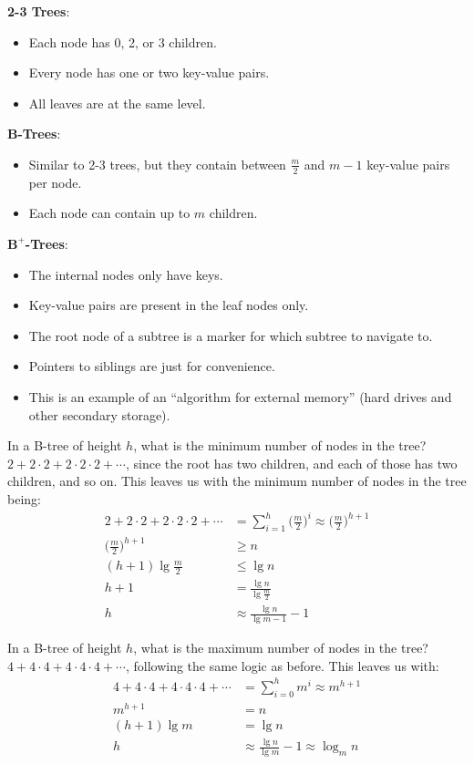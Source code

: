 \documentclass[]{article}
\theoremstyle{definition}
\begin{document}
			\textbf{2-3 Trees}:
			\begin{itemize}
				\item Each node has 0, 2, or 3 children.
				\item Every node has one or two key-value pairs.
				\item All leaves are at the same level.
			\end{itemize}

			\textbf{B-Trees}:
			\begin{itemize}
				\item Similar to 2-3 trees, but they contain between $\frac{m}{2}$ and $m - 1$ key-value pairs per node.
				\item Each node can contain up to $m$ children.
			\end{itemize}

			\textbf{$\boldsymbol{B^+}$-Trees}:
			\begin{itemize}
				\item The internal nodes only have keys.
				\item Key-value pairs are present in the leaf nodes only.
				\item The root node of a subtree is a marker for which subtree to navigate to.
				\item Pointers to siblings are just for convenience.
				\item This is an example of an ``algorithm for external memory'' (hard drives and other secondary storage). 
			\end{itemize}

			In a B-tree of height $h$, what is the minimum number of nodes in the tree? $2 + 2 \cdot 2 + 2 \cdot 2 \cdot 2 + \cdots$, since the root has two children, and each of those has two children, and so on. This leaves us with the minimum number of nodes in the tree being:
			\begin{align*}
				2 + 2 \cdot 2 + 2 \cdot 2 \cdot 2 + \cdots &= \sum_{i = 1}^{h} \bigg(\frac{m}{2}\bigg)^i \approx \bigg(\frac{m}{2}\bigg)^{h + 1} \\
				\bigg(\frac{m}{2}\bigg)^{h + 1} &\ge n \\
				(h + 1) \lg\frac{m}{2} &\le \lg n \\
				h + 1 &= \frac{\lg n}{\lg \frac{m}{2}} \\
				h &\approx \frac{\lg n}{\lg m - 1} - 1
			\end{align*}

			In a B-tree of height $h$, what is the maximum number of nodes in the tree? $4 + 4 \cdot 4 + 4 \cdot 4 \cdot 4 + \cdots$, following the same logic as before. This leaves us with:
			\begin{align*}
				4 + 4 \cdot 4 + 4 \cdot 4 \cdot 4 + \cdots &= \sum_{i = 0}^{h} m^i \approx m^{h + 1} \\
				m^{h + 1} &= n \\
				(h + 1) \lg m &= \lg n \\
				h &\approx \frac{\lg n}{\lg m} - 1 \approx \log_m n
			\end{align*}
			
\end{document}
